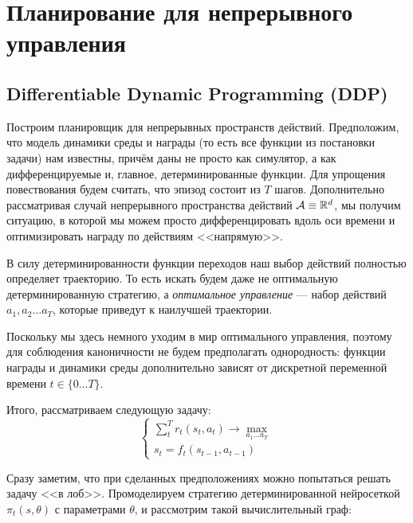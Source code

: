 \section{Планирование для непрерывного управления}\label{lqrsection}

\subsection{Differentiable Dynamic Programming (DDP)}


Построим планировщик для непрерывных пространств действий. Предположим, что модель динамики среды и награды (то есть все функции из постановки задачи) нам известны, причём даны не просто как симулятор, а как дифференцируемые и, главное, детерминированные функции. Для упрощения повествования будем считать, что эпизод состоит из $T$ шагов. Дополнительно рассматривая случай непрерывного пространства действий $\mathcal{A} \equiv \mathbb{R}^d$, мы получим ситуацию, в которой мы можем просто дифференцировать вдоль оси времени и оптимизировать награду по действиям <<напрямую>>.

В силу детерминированности функции переходов наш выбор действий полностью определяет траекторию. То есть искать будем даже не оптимальную детерминированную стратегию, а \emph{оптимальное управление} --- набор действий $a_1, a_2 \dots a_T$, которые приведут к наилучшей траектории. 

Поскольку мы здесь немного уходим в мир оптимального управления, поэтому для соблюдения каноничности не будем предполагать однородность: функции награды и динамики среды дополнительно зависят от дискретной переменной времени $t \in \{0 \dots T\}$. 

Итого, рассматриваем следующую задачу:
\begin{equation}\label{LQRtask}
\begin{cases}
\sum_t^T r_t(s_t, a_t) \to \max\limits_{a_1 \dots a_T} \\
s_t = f_t(s_{t-1}, a_{t-1})
\end{cases}
\end{equation}

Сразу заметим, что при сделанных предположениях можно попытаться решать задачу <<в лоб>>. Промоделируем стратегию детерминированной нейросеткой $\pi_t(s, \theta)$ с параметрами $\theta$, и рассмотрим такой вычислительный граф:

